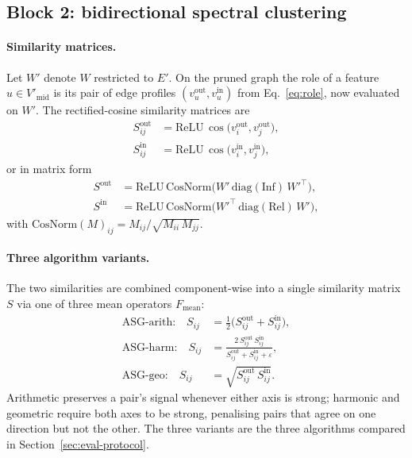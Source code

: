 \subsection{Block 2: bidirectional spectral clustering}\label{sec:solution-cluster}

\paragraph{Similarity matrices.}
Let $W'$ denote $W$ restricted to $E'$. On the pruned graph the role
of a feature $u \in V'_{\text{mid}}$ is its pair of edge profiles
$(v_u^{\text{out}}, v_u^{\text{in}})$ from Eq.~\eqref{eq:role}, now
evaluated on $W'$. The rectified-cosine similarity matrices are
\begin{equation}
\begin{aligned}
S^{\text{out}}_{ij} &= \mathrm{ReLU}\,\cos\!\bigl(v_i^{\text{out}}, v_j^{\text{out}}\bigr), \\
S^{\text{in}}_{ij}  &= \mathrm{ReLU}\,\cos\!\bigl(v_i^{\text{in}},  v_j^{\text{in}}\bigr),
\end{aligned}
\label{eq:Sout-Sin}
\end{equation}
or in matrix form
\begin{equation}
\begin{aligned}
S^{\text{out}} &= \mathrm{ReLU}\,\mathrm{CosNorm}\bigl(W' \,\mathrm{diag}(\mathrm{Inf})\, W'^\top\bigr), \\
S^{\text{in}}  &= \mathrm{ReLU}\,\mathrm{CosNorm}\bigl(W'^\top \,\mathrm{diag}(\mathrm{Rel})\, W'\bigr),
\end{aligned}
\label{eq:Sout-Sin-matrix}
\end{equation}
with $\mathrm{CosNorm}(M)_{ij} = M_{ij}/\sqrt{M_{ii}\,M_{jj}}$.

\paragraph{Three algorithm variants.}
The two similarities are combined component-wise into a single
similarity matrix $S$ via one of three mean operators
$F_{\text{mean}}$:
\begin{equation}
\begin{aligned}
\text{ASG-arith:}\quad S_{ij} &= \tfrac{1}{2}\bigl(S^{\text{out}}_{ij} + S^{\text{in}}_{ij}\bigr), \\
\text{ASG-harm:}\quad S_{ij}  &= \tfrac{2\,S^{\text{out}}_{ij}\,S^{\text{in}}_{ij}}
                                {S^{\text{out}}_{ij} + S^{\text{in}}_{ij} + \varepsilon}, \\
\text{ASG-geo:}\quad S_{ij}   &= \sqrt{S^{\text{out}}_{ij}\,S^{\text{in}}_{ij}}.
\end{aligned}
\label{eq:Fmean}
\end{equation}
Arithmetic preserves a pair's signal whenever either axis is strong;
harmonic and geometric require both axes to be strong, penalising
pairs that agree on one direction but not the other. The three
variants are the three algorithms compared in
Section~\ref{sec:eval-protocol}.

